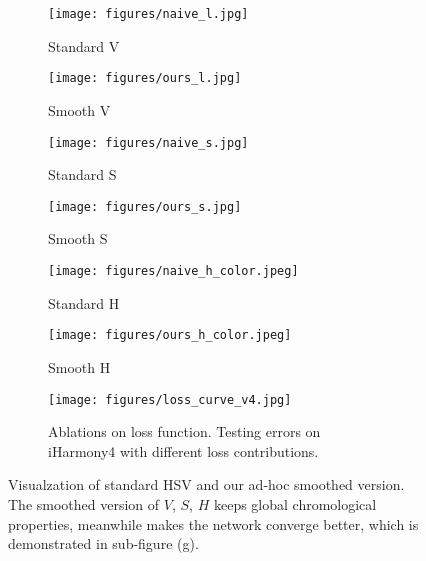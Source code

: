 \documentclass[runningheads]{llncs}
\begin{document}
    \begin{figure}[!thb]
        \centering
    \begin{minipage}[t]{0.35\textwidth}
        \centering
        \begin{subfigure}[t]{0.47\linewidth}
            \centering
            \texttt{[image: figures/naive\_l.jpg]}
            \caption{Standard V}\label{fig:std-l}
        \end{subfigure}
        \begin{subfigure}[t]{0.47\linewidth}
            \centering
            \texttt{[image: figures/ours\_l.jpg]}
            \caption{Smooth V}\label{fig:smo-l}		
        \end{subfigure}

        \begin{subfigure}[t]{0.47\linewidth}
            \centering
            \texttt{[image: figures/naive\_s.jpg]}
            \caption{Standard S}\label{fig:std-s}
        \end{subfigure}
        \begin{subfigure}[t]{0.47\linewidth}
            \centering
            \texttt{[image: figures/ours\_s.jpg]}
            \caption{Smooth S}\label{fig:smo-s}
        \end{subfigure}

        \begin{subfigure}[t]{0.47\linewidth}
            \centering
            \texttt{[image: figures/naive\_h\_color.jpeg]}
            \caption{Standard H}\label{fig:std-h}
        \end{subfigure}
        \begin{subfigure}[t]{0.47\linewidth}
            \centering
            \texttt{[image: figures/ours\_h\_color.jpeg]}
            \caption{Smooth H}\label{fig:smo-h}
        \end{subfigure}
    \end{minipage}
    \begin{minipage}[t]{0.57\textwidth}
        \centering
        \vspace{-45pt}
        \begin{subfigure}[t] {1\linewidth}
            \centering
            \texttt{[image: figures/loss\_curve\_v4.jpg]}
            \caption{
                Ablations on loss function.
            Testing errors on iHarmony4 with different loss contributions.
            } 
            \label{fig:loss_curve}
        \end{subfigure}
    \end{minipage}
    
        \caption{
Visualzation of standard HSV and our ad-hoc smoothed version. The smoothed version of $V$, $S$, $H$ keeps global chromological properties, meanwhile makes the network converge better, which is demonstrated in sub-figure (g).}
    
    \label{fig:hslmap}
    \end{figure}
    
\end{document}
